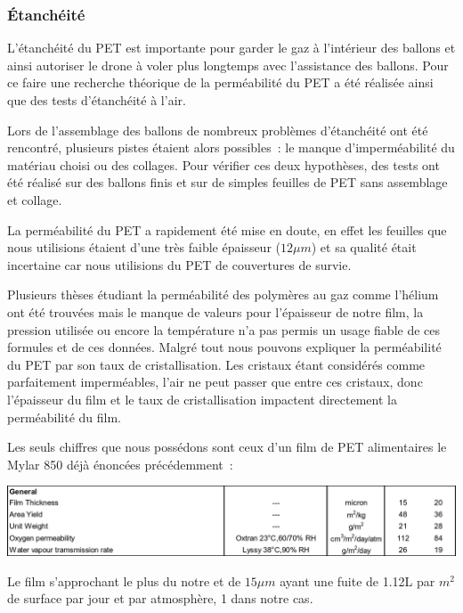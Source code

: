 \documentclass[a4paper,11pt]{article}
\begin{document}
\subsubsection{Étanchéité}

L'étanchéité du PET est importante pour garder le gaz à l'intérieur des ballons et ainsi autoriser le drone à voler plus longtemps avec l'assistance des ballons. Pour ce faire une recherche théorique de la perméabilité du PET a été réalisée ainsi que des tests d'étanchéité à l'air.

Lors de l'assemblage des ballons de nombreux problèmes d'étanchéité ont été rencontré, plusieurs pistes étaient alors possibles~: le manque d'imperméabilité du matériau choisi ou des collages. Pour vérifier ces deux hypothèses, des tests ont été réalisé sur des ballons finis et sur de simples feuilles de PET sans assemblage et collage.


La perméabilité du PET a rapidement été mise en doute, en effet les feuilles que nous utilisions étaient d'une très faible épaisseur ($12\mu m$) et sa qualité était incertaine car nous utilisions du PET de couvertures de survie.

Plusieurs thèses étudiant la perméabilité des polymères au gaz comme l'hélium ont été trouvées mais le manque de valeurs pour l'épaisseur de notre film, la pression utilisée ou encore la température n'a pas permis un usage fiable de ces formules et de ces données.
Malgré tout nous pouvons expliquer la perméabilité du PET par son taux de cristallisation. Les cristaux étant considérés comme parfaitement imperméables, l'air ne peut passer que entre ces cristaux, donc l'épaisseur du film et le taux de cristallisation impactent directement la perméabilité du film.

Les seuls chiffres que nous possédons sont ceux d'un film de PET alimentaires le Mylar 850 déjà énoncées précédemment~:

\begin{center}
 \includegraphics[width=15cm]{../Images/permeabilite.png}
\end{center}

Le film s'approchant le plus du notre et de $15\mu m$ ayant une fuite de 1.12L par $m^2$ de surface par jour et par atmosphère, 1 dans notre cas.
\end{document}
